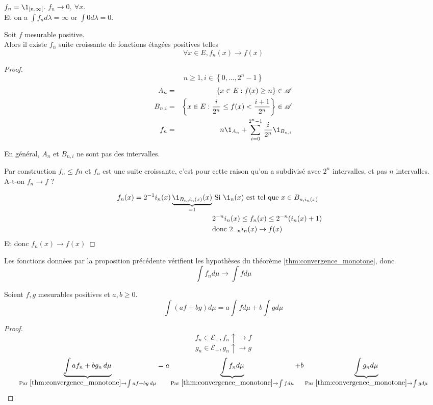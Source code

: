 \begin{example}
	$f_n = \1_{[n, \infty[}$. $f_n \to 0, \ \forall x $.\\
	Et on a  $\int f_n d\lambda = \infty$ or $\int 0 d\lambda = 0$.
\end{example}

\begin{prop}
	Soit $f$ mesurable positive.\\
	Alors il existe $f_n$ suite croissante de fonctions étagées positives telles
	$$\forall x \in E, f_n(x) \to f(x)$$
\end{prop}


\begin{proof} %
	$$n \geq 1, i \in \left\{0, \dots, 2^n - 1\right\}$$
	\begin{eqnarray*}
		A_{n} &=& \left\{ x \in E : f(x) \geq n \right\} \in \triA \\
		B_{n,i} &=& \left\{ x \in E : \frac{i}{2^n} \leq f(x) < \frac{i+1}{2^n} \right\} \in \triA \\
		f_n & = & n \1_{A_n} + \sum_{i=0}^{2^n - 1} \frac{i}{2^n} \1_{B_{n,i}}
	\end{eqnarray*}

	En général, $A_n$ et $B_{n,i}$ ne sont pas des intervalles.

	Par construction $f_n \leq fn$ et $f_n$ est une suite croissante, c'est pour cette raison qu'on a subdivisé avec $2^n$ intervalles, et pas $n$ intervalles.\\
	A-t-on $f_n \to f$ ?

	\begin{eqnarray*}
		f_n(x) =  2^{-1} i_n(x)\underbrace{\1_{B_n,i_n(x)}(x)}_{=1} &\text{ Si } \1_n(x) \text{ est tel que } x \in B_{n,i_n(x)} & \\
		& 2^{-n}i_n(x) \leq f_n(x) \leq 2^{-n}(i_n(x) + 1) &\\
		& \text{donc } 2_{-n}i_n(x) \to f(x) &
	\end{eqnarray*}
	Et donc $f_n(x) \to f(x)$
\end{proof}

\begin{remarque}
	Les fonctions données par la proposition précédente vérifient les hypothèses du théorème \ref{thm:convergence_monotone}, donc
	$$ \int f_n d\mu \to \int f d\mu $$
\end{remarque}


\begin{prop}[Linéarité]
	Soient $f,g$ mesurables positives et $a, b\geq 0$.
	$$ \int (af + bg) d\mu = a\int f d\mu + b\int g d\mu $$
\end{prop}


\begin{proof}
	$$f_n \in \mathcal{E}_+, f_n \uparrow \to f$$
	$$ g_n \in \mathcal{E}_+, g_n \uparrow \to g$$
	$$ \underbrace{\int a f_n + b g_n \,d\mu}_{\text{Par } \ref{thm:convergence_monotone} \to \int a f + b g\,d\mu}
		= a \underbrace{\int f_n d\mu}_{ \text{Par } \ref{thm:convergence_monotone} \to \int f d\mu}
		+ b \underbrace{\int g_n d\mu}_{ \text{Par } \ref{thm:convergence_monotone} \to \int g d\mu} $$
\end{proof}

